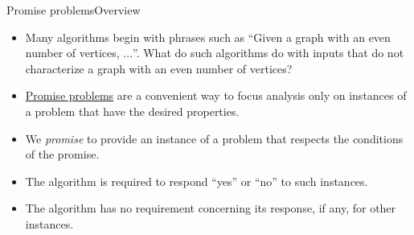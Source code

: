\begin{frame}{Promise problems}{Overview}
    \begin{itemize}[<+->]
    \item Many algorithms begin with phrases such as ``Given a graph with an even number of vertices, $\ldots$''.  What do such algorithms do with inputs that do not characterize a graph with an even number of vertices?
    \item \href{https://en.wikipedia.org/wiki/Promise_problem}{Promise problems} are a convenient way to focus analysis only on instances of a problem that have the desired properties.
    \item We \emph{promise} to provide an instance of a problem that respects the conditions of the promise.
    \item The algorithm is required to respond ``yes'' or ``no'' to such instances.
    \item The algorithm has no requirement concerning its response, if any, for other instances.
\end{itemize}

\end{frame}
